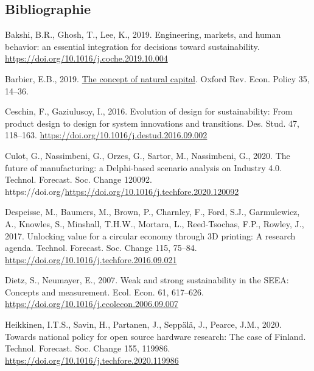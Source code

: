 \documentclass[
  12pt,
  oneside]{book}
\newlength{\cslhangindent}
\newlength{\cslentryspacingunit} %
\newenvironment{CSLReferences}[2] %
 {%
  \setlength{\parindent}{0pt}
  \ifodd #1
  \let\oldpar\par
  \def\par{\hangindent=\cslhangindent\oldpar}
  \fi
  \setlength{\parskip}{#2\cslentryspacingunit}
 }%
 {}
\begin{document}
\newpage

\hypertarget{bibliographie}{%
\subsection{Bibliographie}\label{bibliographie}}

\hypertarget{refs}{}
\begin{CSLReferences}{1}{0}
\leavevmode{}%
Bakshi, B.R., Ghosh, T., Lee, K., 2019. {Engineering, markets, and human behavior: an essential integration for decisions toward sustainability}. \url{https://doi.org/10.1016/j.coche.2019.10.004}

\leavevmode{}%
Barbier, E.B., 2019. \href{https://academic.oup.com/oxrep/article/35/1/14/5267896}{{The concept of natural capital}}. Oxford Rev. Econ. Policy 35, 14--36.

\leavevmode{}%
Ceschin, F., Gaziulusoy, I., 2016. {Evolution of design for sustainability: From product design to design for system innovations and transitions}. Des. Stud. 47, 118--163. \url{https://doi.org/10.1016/j.destud.2016.09.002}

\leavevmode{}%
Culot, G., Nassimbeni, G., Orzes, G., Sartor, M., Nassimbeni, G., 2020. {The future of manufacturing: a Delphi-based scenario analysis on Industry 4.0}. Technol. Forecast. Soc. Change 120092. https://doi.org/\url{https://doi.org/10.1016/j.techfore.2020.120092}

\leavevmode{}%
Despeisse, M., Baumers, M., Brown, P., Charnley, F., Ford, S.J., Garmulewicz, A., Knowles, S., Minshall, T.H.W., Mortara, L., Reed-Tsochas, F.P., Rowley, J., 2017. {Unlocking value for a circular economy through 3D printing: A research agenda}. Technol. Forecast. Soc. Change 115, 75--84. \url{https://doi.org/10.1016/j.techfore.2016.09.021}

\leavevmode{}%
Dietz, S., Neumayer, E., 2007. {Weak and strong sustainability in the SEEA: Concepts and measurement}. Ecol. Econ. 61, 617--626. \url{https://doi.org/10.1016/j.ecolecon.2006.09.007}

\leavevmode{}%
Heikkinen, I.T.S., Savin, H., Partanen, J., Seppälä, J., Pearce, J.M., 2020. {Towards national policy for open source hardware research: The case of Finland}. Technol. Forecast. Soc. Change 155, 119986. \url{https://doi.org/10.1016/j.techfore.2020.119986}


\end{CSLReferences}
\end{document}
